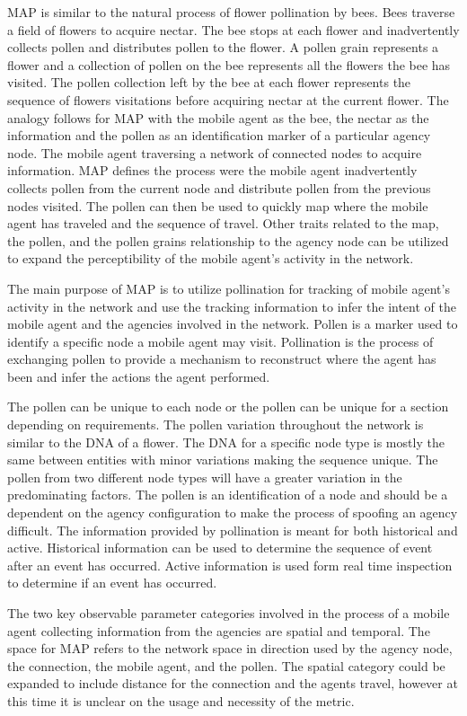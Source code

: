 \documentclass{acm_proc_article-sp}
\begin{document}
MAP is similar to the natural process of flower pollination by bees. Bees traverse a field of flowers to acquire nectar. The bee stops at each flower and inadvertently collects pollen and distributes pollen to the flower. A pollen grain represents a flower and a collection of pollen on the bee represents all the flowers the bee has visited. The pollen collection left by the bee at each flower represents the sequence of flowers visitations before acquiring nectar at the current flower. The analogy follows for MAP with the mobile agent as the bee, the nectar as the information and the pollen as an identification marker of a particular agency node.  The mobile agent traversing a network of connected nodes to acquire information.  MAP defines the process were the mobile agent inadvertently collects pollen from the current node and distribute pollen from the previous nodes visited. The pollen can then be used to quickly map where the mobile agent has traveled and the sequence of travel. Other traits related to the map, the pollen, and the pollen grains relationship to the agency node can be utilized to expand the perceptibility of the mobile agent’s activity in the network.    

The main purpose of MAP is to utilize pollination for tracking of mobile agent’s activity in the network and use the tracking information to infer the intent of the mobile agent and the agencies involved in the network.  Pollen is a marker used to identify a specific node a mobile agent may visit. Pollination is the process of exchanging pollen to provide a mechanism to reconstruct where the agent has been and infer the actions the agent performed.

The pollen can be unique to each node or the pollen can be unique for a section depending on requirements. The pollen variation throughout the network is similar to the DNA of a flower. The DNA for a specific node type is mostly the same between entities with minor variations making the sequence unique. The pollen from two different node types will have a greater variation in the predominating factors. The pollen is an identification of a node and should be a dependent on the agency configuration to make the process of spoofing an agency difficult. The information provided by pollination is meant for both historical and active. Historical information can be used to determine the sequence of event after an event has occurred. Active information is used form real time inspection to determine if an event has occurred.

The two key observable parameter categories involved in the process of a mobile agent collecting information from the agencies are spatial and temporal. The space for MAP refers to the network space in direction used by the agency node, the connection, the mobile agent, and the pollen.  The spatial category could be expanded to include distance for the connection and the agents travel, however at this time it is unclear on the usage and necessity of the metric.  
\end{document}
